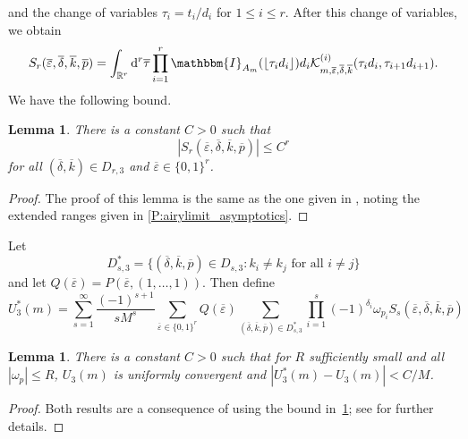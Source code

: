 \documentclass[11pt,twoside]{amsart}
\theoremstyle{plain}
\newtheorem{lem}[thm]{Lemma}
\numberwithin{quest}{section}
\theoremstyle{remark}
\numberwithin{rem}{section}
\theoremstyle{definition}
\newcommand{\eps}{\varepsilon}
\begin{document}
and the change of variables $\tau_i=t_i/d_i$ for $1 \leq i \leq r$.  
After this change of variables, we obtain
\begin{equation*}
	S_r (\overline{\eps}, \overline{\delta} ,\overline{k},\overline{p}  ) = \int_{\mathbb{R}^r} \mathrm{d}^r \overline{\tau} \prod_{i=1}^r \mathbbm{I}_{A_{m}} (\lfloor \tau_i d_i \rfloor ) d_i  \mathcal{K}^{(i)}_{m,\overline{\eps},\overline{\delta},\overline{k} } (\tau_i d_i , \tau_{i+1}d_{i+1} ).
\end{equation*}
We have the following bound.
\begin{lem} \label{L:Srbound}
	There is a constant $C>0$ such that  
	\begin{equation*}
		|S_r (\overline{\eps}, \overline{\delta} ,\overline{k},\overline{p} ) | \leq C^r
	\end{equation*}
	for all $(\overline{\delta} ,\overline{k} ) \in D_{r,3}$ and $\overline{\eps} \in \{0,1\}^r$.  
\end{lem}
\begin{proof}
	The proof of this lemma is the same as the one given in \cite[Lemma 4.3]{BCJ18}, noting the extended ranges given in \cref{P:airylimit_asymptotics}. 
\end{proof}
Let 
\begin{equation*}
	D_{s,3}^*=\{(\overline{\delta},\overline{k}, \overline{p}) \in D_{s,3}: k_i\not= k_j \text{ for all }i \not =j\}
\end{equation*}
and let $Q(\overline{\eps})=P(\overline{\eps},(1,\dots,1))$.  Then define 
\begin{equation*}
	U_3^*(m)=\sum_{s=1}^{\infty}\frac{(-1)^{s+1}}{sM^s}\sum_{\overline{\eps} \in \{0,1\}^r} Q(\overline{\eps}) \sum_{(\overline{\delta},\overline{k}, \overline{p}) \in D_{s,3}^*} \prod_{i=1}^s (-1)^{\delta_i} \omega_{p_i} S_s (\overline{\eps},\overline{\delta},\overline{k},\overline{p})
\end{equation*}
\begin{lem}
There is a constant $C > 0$ such that for $R$ sufficiently small and all $|\omega_p| \le R$, $U_3(m)$ is uniformly convergent and $|U_3^*(m)-U_3(m)|<C/M$.  
\end{lem}
\begin{proof}
	Both results are a consequence of using the bound in~\cref{L:Srbound}; see \cite[Lemma 4.4 and Lemma 4.5]{BCJ18} for further details. 
\end{proof}
\end{document}
